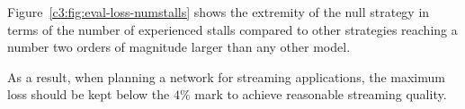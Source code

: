 Figure~\ref{c3:fig:eval-loss-numstalls} shows the extremity of the null strategy in terms of the number of experienced stalls compared to other strategies reaching a number two orders of magnitude larger than any other model. 


As a result, when planning a network for streaming applications, the maximum loss should be kept below the $4\%$ mark to achieve reasonable streaming quality. 









